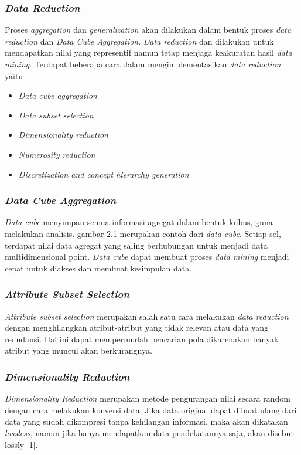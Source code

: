 \subsubsection{\textsl{Data Reduction}}
Proses \textsl{aggregation} dan \textsl{generalization} akan dilakukan dalam bentuk proses \textsl{data reduction} dan \textsl{Data Cube Aggregation}.
\textsl{Data reduction} dan dilakukan untuk mendapatkan nilai yang representif namun tetap menjaga keakuratan hasil \textsl{data mining}. Terdapat beberapa cara dalam mengimplementasikan \textsl{data reduction} yaitu
	\begin{itemize}
		\item \textsl{Data cube aggregation}
		\item \textsl{Data subset selection}
		\item \textsl{Dimensionality reduction}
		\item \textsl{Numerosity reduction}
		\item \textsl{Discretization and concept hierarchy generation}
	\end{itemize}

\subsubsection{\textsl{Data Cube Aggregation}}
\textsl{Data cube} menyimpan semua informasi agregat dalam bentuk kubus, guna melakukan analisis. gambar 2.1 merupakan contoh dari \textsl{data cube}. Setiap sel, terdapat nilai data agregat yang saling berhubungan untuk menjadi data multidimensional point. \textsl{Data cube} dapat membuat proses \textsl{data mining} menjadi cepat untuk diakses dan membuat kesimpulan data. 

\subsubsection {\textsl{Attribute Subset Selection}}
\textsl{Attribute subset selection} merupakan salah satu cara melakukan \textsl{data reduction} dengan menghilangkan atribut-atribut yang tidak relevan atau data yang redudansi. Hal ini dapat mempermudah pencarian pola dikarenakan banyak atribut yang muncul akan berkurangnya. 

\subsubsection {\textsl{Dimensionality Reduction}}
\textsl{Dimensionality Reduction} merupakan metode pengurangan nilai secara random dengan cara melakukan konversi data. Jika data original dapat dibuat ulang dari data yang sudah dikompresi tanpa kehilangan informasi, maka akan dikatakan \textsl{lossless}, namun jika hanya mendapatkan data pendekatannya saja, akan disebut lossly [1].

